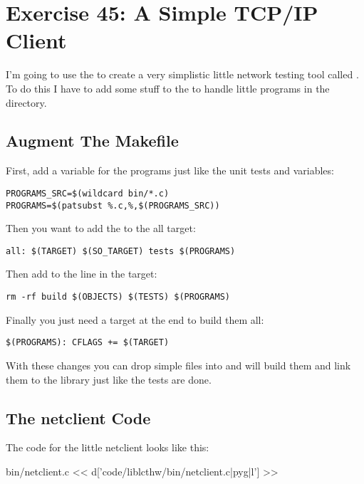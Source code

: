 \chapter{Exercise 45: A Simple TCP/IP Client}

I'm going to use the  to create a very simplistic little
network testing tool called .  To do this I have to
add some stuff to the  to handle little programs in the
 directory.

\section{Augment The Makefile}

First, add a variable for the programs just like the unit tests 
and  variables:

\begin{Verbatim}
PROGRAMS_SRC=$(wildcard bin/*.c)
PROGRAMS=$(patsubst %.c,%,$(PROGRAMS_SRC))
\end{Verbatim}

Then you want to add the  to the all target:

\begin{Verbatim}
all: $(TARGET) $(SO_TARGET) tests $(PROGRAMS)
\end{Verbatim}

Then add  to the  line in the 
target:

\begin{Verbatim}
rm -rf build $(OBJECTS) $(TESTS) $(PROGRAMS)
\end{Verbatim}

Finally you just need a target at the end to build them all:

\begin{Verbatim}
$(PROGRAMS): CFLAGS += $(TARGET)
\end{Verbatim}

With these changes you can drop simple  files into 
and  will build them and link them to the library just
like the tests are done.

\section{The netclient Code}

The code for the little netclient looks like this:

\begin{code}{bin/netclient.c}
<< d['code/liblcthw/bin/netclient.c|pyg|l'] >>
\end{code}

